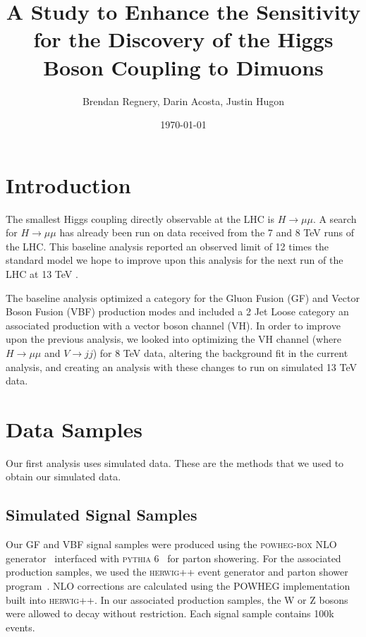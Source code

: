 \documentclass[12pt]{article}
\title{A Study to Enhance the Sensitivity for the Discovery of the Higgs Boson Coupling to Dimuons}
\author{Brendan Regnery, Darin Acosta, Justin Hugon}
\date{\today}
\begin{document}
\maketitle
 
\section{Introduction}

The smallest Higgs coupling directly observable at the LHC is $H\rightarrow \mu \mu$. 
A search for $H\rightarrow \mu \mu$ has already been run on data received from the 7 and 8 TeV runs of the LHC. 
This baseline analysis reported an observed limit of 12 times the standard model \cite{hmumuPap} 
we hope to improve upon this analysis for the next run of the LHC at 13 TeV \cite{AN2012_459}. 

The baseline analysis optimized a category for the Gluon Fusion (GF) and Vector Boson Fusion (VBF) production modes and included 
a 2 Jet Loose category an associated production with a vector boson channel (VH). 
In order to improve upon the previous analysis, we looked into optimizing the VH channel (where $H\rightarrow \mu \mu$ and $V\rightarrow jj$) for 8 TeV data, 
altering the background fit in the current analysis, and creating an analysis with these changes to run on simulated 13 TeV data.

\section{Data Samples}

Our first analysis uses simulated data. These are the methods that we used to obtain our simulated data.

\subsection{Simulated Signal Samples}

Our GF and VBF signal samples were produced using the \textsc{powheg-box} NLO generator~\cite{powheg1,powheg2,powheg3} 
interfaced with \textsc{pythia} 6~\cite{pythia} for parton showering.
For the associated production samples, we used the \textsc{herwig}++ event generator and 
parton shower program~\cite{herwigpp}.  NLO corrections are calculated using the 
POWHEG implementation built into \textsc{herwig}++. 
In our associated production samples, the W or Z bosons were allowed to decay without restriction.
Each signal sample contains 100k events.
\end{document}
